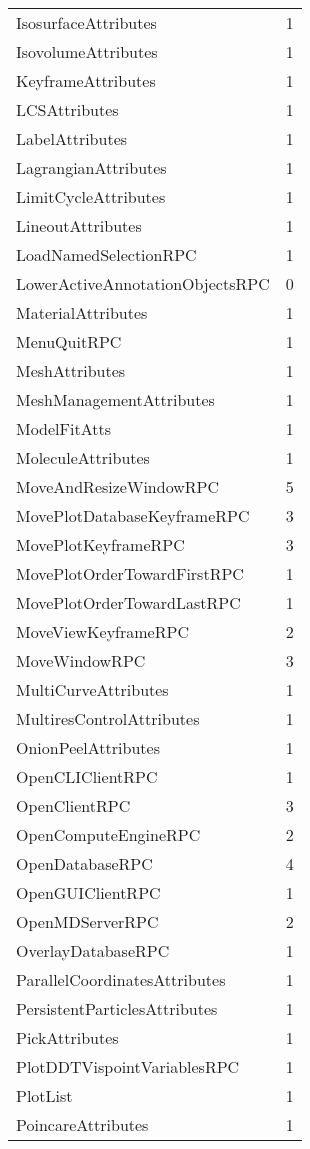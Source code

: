 \documentclass[10pt,a4paper]{report}
\begin{document}
\begin{longtable}{ll}
IsosurfaceAttributes & 1 \\
IsovolumeAttributes & 1 \\
KeyframeAttributes & 1 \\
LCSAttributes & 1 \\
LabelAttributes & 1 \\
LagrangianAttributes & 1 \\
LimitCycleAttributes & 1 \\
LineoutAttributes & 1 \\
LoadNamedSelectionRPC & 1 \\
LowerActiveAnnotationObjectsRPC & 0 \\
MaterialAttributes & 1 \\
MenuQuitRPC & 1 \\
MeshAttributes & 1 \\
MeshManagementAttributes & 1 \\
ModelFitAtts & 1 \\
MoleculeAttributes & 1 \\
MoveAndResizeWindowRPC & 5 \\
MovePlotDatabaseKeyframeRPC & 3 \\
MovePlotKeyframeRPC & 3 \\
MovePlotOrderTowardFirstRPC & 1 \\
MovePlotOrderTowardLastRPC & 1 \\
MoveViewKeyframeRPC & 2 \\
MoveWindowRPC & 3 \\
MultiCurveAttributes & 1 \\
MultiresControlAttributes & 1 \\
OnionPeelAttributes & 1 \\
OpenCLIClientRPC & 1 \\
OpenClientRPC & 3 \\
OpenComputeEngineRPC & 2 \\
OpenDatabaseRPC & 4 \\
OpenGUIClientRPC & 1 \\
OpenMDServerRPC & 2 \\
OverlayDatabaseRPC & 1 \\
ParallelCoordinatesAttributes & 1 \\
PersistentParticlesAttributes & 1 \\
PickAttributes & 1 \\
PlotDDTVispointVariablesRPC & 1 \\
PlotList & 1 \\
PoincareAttributes & 1 \\

\end{longtable}
\end{document}
